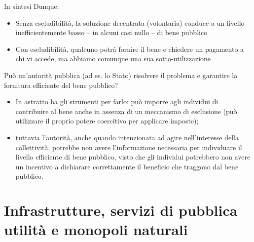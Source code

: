 \documentclass[aspectratio=64,11pt]{beamer}
\begin{document}
\begin{frame}{In sintesi}
Dunque:
\begin{itemize}
\item Senza escludibilità, la soluzione decentrata (volontaria) conduce a un
livello inefficientemente basso -- in alcuni casi nullo -- di bene pubblico
\item Con escludibilità, qualcuno potrà fornire il bene e chiedere un pagamento a
chi vi accede, ma abbiamo comunque una sua sotto-utilizzazione
\end{itemize}
Può un'\alert{autorità pubblica} (ad es. lo Stato) risolvere il problema e garantire la fornitura efficiente del bene pubblico?
\begin{itemize}
\item In astratto ha gli strumenti per farlo: può imporre agli individui di
contribuire al bene anche in assenza di un meccanismo di esclusione (può
utilizzare il proprio potere coercitivo per applicare \alert{imposte});
\item tuttavia l'autorità, anche quando intenzionata ad agire nell'interesse della
collettività, potrebbe non avere l'\alert{informazione} necessaria per individuare
il livello efficiente di bene pubblico, visto che gli individui potrebbero
non avere un incentivo a dichiarare correttamente il beneficio che traggono dal
bene pubblico.
\end{itemize}
\end{frame}


\section{Infrastrutture, servizi di pubblica utilità e monopoli naturali}
\end{document}

